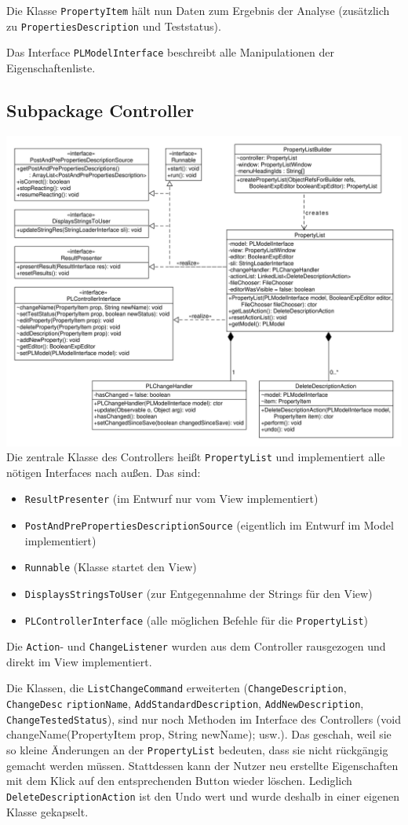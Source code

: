\documentclass[a4paper]{scrreprt}
\begin{document}
Die Klasse \verb!PropertyItem! hält nun Daten zum Ergebnis der Analyse (zusätzlich zu \verb!PropertiesDescription! und Teststatus).

Das Interface \verb!PLModelInterface! beschreibt alle Manipulationen der Eigenschaftenliste.

\subsection{Subpackage Controller}
\includegraphics[width=1.0\textwidth]{PropertyListController.pdf}
Die zentrale Klasse des Controllers heißt \verb!PropertyList! und implementiert alle nötigen Interfaces nach außen. Das sind:
\begin{itemize}
	\item \verb!ResultPresenter! (im Entwurf nur vom View implementiert)
	\item \verb!PostAndPrePropertiesDescriptionSource! (eigentlich im Entwurf im Model implementiert)
	\item \verb!Runnable! (Klasse startet den View)
	\item \verb!DisplaysStringsToUser! (zur Entgegennahme der Strings für den View)
	\item \verb!PLControllerInterface! (alle möglichen Befehle für die \verb!PropertyList!)
\end{itemize}
Die \verb!Action!- und \verb!ChangeListener! wurden aus dem Controller rausgezogen und direkt im View implementiert.

Die Klassen, die \verb!ListChangeCommand! erweiterten (\verb!ChangeDescription!,  \verb!ChangeDesc! \verb!riptionName!, \verb!AddStandardDescription!, \verb!AddNewDescription!, \verb!ChangeTestedStatus!), sind nur noch Methoden im Interface des Controllers (void changeName(PropertyItem prop, String newName); usw.). Das geschah, weil sie so kleine Änderungen an der \verb!PropertyList! bedeuten, dass sie nicht rückgängig gemacht werden müssen. Stattdessen kann der Nutzer neu erstellte Eigenschaften mit dem Klick auf den entsprechenden Button wieder löschen. Lediglich \verb!DeleteDescriptionAction! ist den Undo wert und wurde deshalb in einer eigenen Klasse gekapselt.
\end{document}
